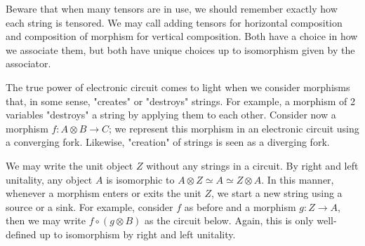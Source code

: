 \documentclass[../thesis.tex]{subfiles}
\begin{document}
            Beware that when many tensors are in use, we should remember exactly how each string is tensored. We may call adding tensors for horizontal composition and composition of morphism for vertical composition. Both have a choice in how we associate them, but both have unique choices up to isomorphism given by the associator. 

            The true power of electronic circuit comes to light when we consider morphisms that, in some sense, "creates" or "destroys" strings. For example, a morphism of 2 variables "destroys" a string by applying them to each other. Consider now a morphism $f: A \otimes B \rightarrow C$; we represent this morphism in an electronic circuit using a converging fork. Likewise, "creation" of strings is seen as a diverging fork.
            \begin{center}
            \end{center}

            We may write the unit object $Z$ without any strings in a circuit. By right and left unitality, any object $A$ is isomorphic to $A \otimes Z \simeq A \simeq Z \otimes A$. In this manner, whenever a morphism enters or exits the unit $Z$, we start a new string using a source or a sink. For example, consider $f$ as before and a morphism $g: Z \rightarrow A$, then we may write $f \circ (g \otimes B)$ as the circuit below. Again, this is only well-defined up to isomorphism by right and left unitality.
            \begin{center}
            \end{center}
\end{document}
